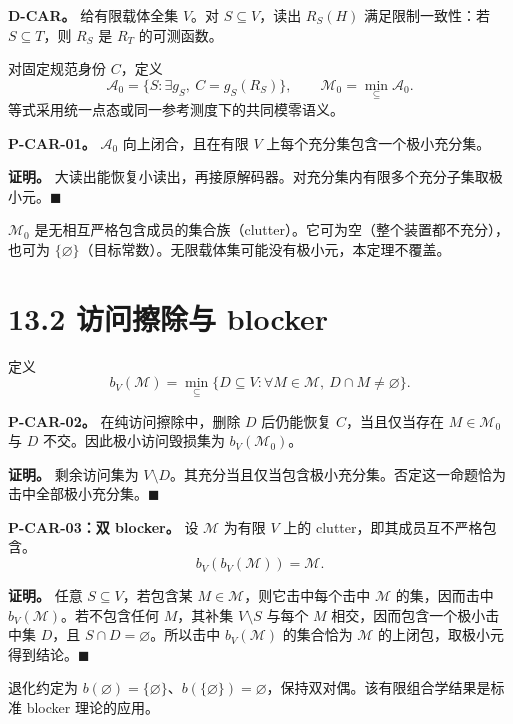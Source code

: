 \documentclass[
  11pt,
  oneside]{book}
\begin{document}
\textbf{D-CAR。} 给有限载体全集 \(V\)。对 \(S\subseteq V\)，读出 \(R_S(H)\) 满足限制一致性：若 \(S\subseteq T\)，则 \(R_S\) 是 \(R_T\) 的可测函数。

对固定规范身份 \(C\)，定义 \[\mathcal A_0=\{S:\exists g_S,\ C=g_S(R_S)\},
\qquad
\mathcal M_0=\min_{\subseteq}\mathcal A_0.\] 等式采用统一点态或同一参考测度下的共同模零语义。

\hypertarget{p-car-01}{}\label{p-car-01}

\textbf{P-CAR-01。} \(\mathcal A_0\) 向上闭合，且在有限 \(V\) 上每个充分集包含一个极小充分集。

\textbf{证明。} 大读出能恢复小读出，再接原解码器。对充分集内有限多个充分子集取极小元。\(\blacksquare\)

\(\mathcal M_0\) 是无相互严格包含成员的集合族（clutter）。它可为空（整个装置都不充分），也可为 \(\{\varnothing\}\)（目标常数）。无限载体集可能没有极小元，本定理不覆盖。

\section{13.2 访问擦除与 blocker}\label{ux8bbfux95eeux64e6ux9664ux4e0e-blocker}

定义 \[b_V(\mathcal M)=
\min_{\subseteq}\{D\subseteq V:\forall M\in\mathcal M,\ D\cap M\ne\varnothing\}.\]

\hypertarget{p-car-02}{}\label{p-car-02}

\textbf{P-CAR-02。} 在纯访问擦除中，删除 \(D\) 后仍能恢复 \(C\)，当且仅当存在 \(M\in\mathcal M_0\) 与 \(D\) 不交。因此极小访问毁损集为 \(b_V(\mathcal M_0)\)。

\textbf{证明。} 剩余访问集为 \(V\setminus D\)。其充分当且仅当包含极小充分集。否定这一命题恰为击中全部极小充分集。\(\blacksquare\)

\hypertarget{p-car-03}{}\label{p-car-03}

\textbf{P-CAR-03：双 blocker。} 设 \(\mathcal M\) 为有限 \(V\) 上的 clutter，即其成员互不严格包含。 \[b_V(b_V(\mathcal M))=\mathcal M.\]

\textbf{证明。} 任意 \(S\subseteq V\)，若包含某 \(M\in\mathcal M\)，则它击中每个击中 \(\mathcal M\) 的集，因而击中 \(b_V(\mathcal M)\)。若不包含任何 \(M\)，其补集 \(V\setminus S\) 与每个 \(M\) 相交，因而包含一个极小击中集 \(D\)，且 \(S\cap D=\varnothing\)。所以击中 \(b_V(\mathcal M)\) 的集合恰为 \(\mathcal M\) 的上闭包，取极小元得到结论。\(\blacksquare\)

退化约定为 \(b(\varnothing)=\{\varnothing\}\)、\(b(\{\varnothing\})=\varnothing\)，保持双对偶。该有限组合学结果是标准 blocker 理论的应用。
\end{document}

